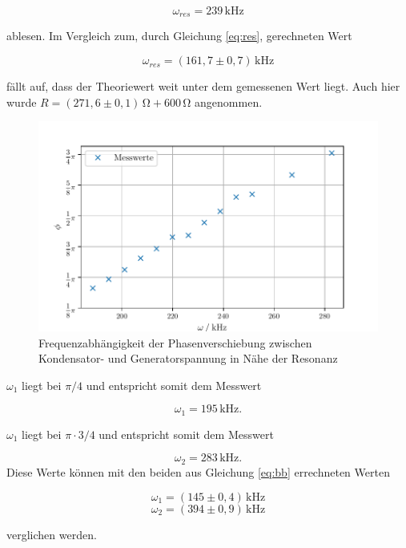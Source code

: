 \begin{equation*}
  \omega_{res}=239\,\si{\kilo\hertz}
\end{equation*}


\noindent ablesen. Im Vergleich zum, durch Gleichung \ref{eq:res},
gerechneten Wert

\begin{equation*}
  \omega_{res}=(161,7\pm0,7)\,\si{\kilo\hertz}
\end{equation*}

\noindent fällt auf, dass der Theoriewert weit unter dem gemessenen Wert liegt.
Auch hier wurde $R=(271,6\pm0,1)\,\si{\ohm} + 600\,\si{\ohm}$ angenommen.
\begin{figure}[H]
  \centering
  \includegraphics{build/plot5.pdf}
  \caption{Frequenzabhängigkeit der Phasenverschiebung zwischen Kondensator- und Generatorspannung in Nähe der Resonanz}
  \label{fig:i}
\end{figure}
\noindent $\omega_1$ liegt bei $\pi/4$ und entspricht
somit dem Messwert

\begin{equation*}
  \omega_1=195\,\si{\kilo\hertz}.
\end{equation*}


\noindent $\omega_1$ liegt bei $\pi \cdot 3/4$ und entspricht
somit dem Messwert

\begin{equation*}
\omega_2=283\,\si{\kilo\hertz}.
\end{equation*}
\noindent Diese Werte können mit den beiden aus Gleichung \ref{eq:bb}
errechneten Werten 

\begin{equation*}
  \omega_1=(145\pm0,4)\,\si{\kilo\hertz}
\end{equation*}
\begin{equation*}
  \omega_2=(394\pm0,9)\,\si{\kilo\hertz}
\end{equation*}

\noindent verglichen werden.


